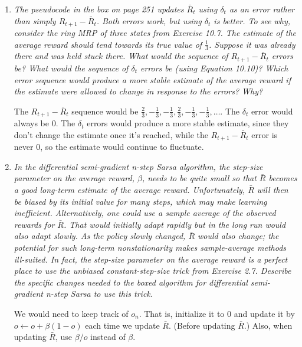 \documentclass[12pt,a4paper]{article}
\begin{document}
\begin{enumerate}
  \item \textit{The pseudocode in the box on page 251 updates $\bar{R}_t$ using $\delta_t$
  as an error rather than simply $R_{t + 1} - \bar{R}_t$. Both errors work, but using
  $\delta_t$ is better. To see why, consider the ring MRP of three states from
  Exercise 10.7. The estimate of the average reward should tend towards its true
  value of $\frac{1}{3}$. Suppose it was already there and was
  held stuck there. What would the sequence of $R_{t + 1} - \bar{R}_t$ errors be?
  What would the sequence of $\delta_t$ errors be (using Equation 10.10)? Which error
  sequence would produce a more stable estimate of the average reward if the estimate
  were allowed to change in response to the errors? Why?}

  The $R_{t + 1} - \bar{R}_t$ sequence would be $\frac{2}{3}, -\frac{1}{3},-\frac{1}{3},
  \frac{2}{3}, -\frac{1}{3}, -\frac{1}{3}, \dots$. The $\delta_t$ error would always
  be $0$. The $\delta_t$ errors would produce a more stable estimate, since they don't
  change the estimate once it's reached, while the $R_{t + 1} - \bar{R}_t$ error is never
  $0$, so the estimate would continue to fluctuate.

  \item \textit{In the differential semi-gradient n-step Sarsa algorithm, the step-size
  parameter on the average reward, $\beta$, needs to be quite small so that $\bar{R}$ becomes a good
  long-term estimate of the average reward. Unfortunately, $\bar{R}$ will then be biased by its
  initial value for many steps, which may make learning inefficient. Alternatively, one could
  use a sample average of the observed rewards for $\bar{R}$. That would initially adapt rapidly
  but in the long run would also adapt slowly. As the policy slowly changed, $\bar{R}$ would also
  change; the potential for such long-term nonstationarity makes sample-average methods
  ill-suited. In fact, the step-size parameter on the average reward is a perfect place to use
  the unbiased constant-step-size trick from Exercise 2.7. Describe the specific changes
  needed to the boxed algorithm for differential semi-gradient n-step Sarsa to use this
  trick.}

  We would need to keep track of $o_n$. That is, initialize it to $0$ and update it
  by $o \leftarrow o + \beta(1 - o)$ each time we update $\bar{R}$. (Before updating
  $\bar{R}$.) Also, when updating $\bar{R}$, use $\beta / o$ instead of $\beta$.
\end{enumerate}
\end{document}
